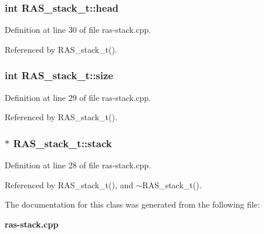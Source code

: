 \subsubsection[{head}]{\setlength{\rightskip}{0pt plus 5cm}int {\bf RAS\_\-stack\_\-t::head}\hspace{0.3cm}{\tt  [protected]}}\label{classRAS__stack__t_d43a39ae16eb6a362089c6eb00a354fc}




Definition at line 30 of file ras-stack.cpp.

Referenced by RAS\_\-stack\_\-t().
\subsubsection[{size}]{\setlength{\rightskip}{0pt plus 5cm}int {\bf RAS\_\-stack\_\-t::size}\hspace{0.3cm}{\tt  [protected]}}\label{classRAS__stack__t_68c8edf975a2ca73dda9087563cc2ee6}




Definition at line 29 of file ras-stack.cpp.

Referenced by RAS\_\-stack\_\-t().
\subsubsection[{stack}]{$\ast$ {\bf RAS\_\-stack\_\-t::stack}\hspace{0.3cm}{\tt  [protected]}}\label{classRAS__stack__t_41dce029c72eb86f0f7725260d108b56}




Definition at line 28 of file ras-stack.cpp.

Referenced by RAS\_\-stack\_\-t(), and $\sim$RAS\_\-stack\_\-t().

The documentation for this class was generated from the following file:\begin{CompactItemize}
\item 
{\bf ras-stack.cpp}\end{CompactItemize}
